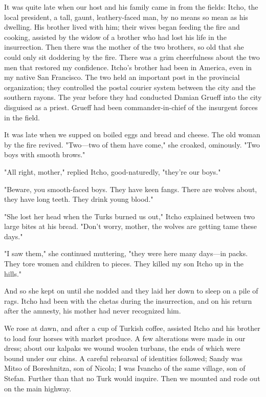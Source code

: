 \documentclass[a5paper,12pt]{book}
\begin{document}
It was quite late when our host and his family came in from the fields: Itcho, the local president, a tall, gaunt, leathery-faced man, by no means so mean as his dwelling. His brother lived with him; their wives began feeding the fire and cooking, assisted by the widow of a brother who had lost his life in the insurrection. Then there was the mother of the two brothers, so old that she could only sit doddering by the fire. There was a grim cheerfulness about the two men that restored my confidence. Itcho’s brother had been in America, even in my native San Francisco. The two held an important post in the provincial organization; they controlled the postal courier system between the city and the southern rayons. The year before they had conducted Damian Grueff into the city disguised as a priest. Grueff had been commander-in-chief of the insurgent forces in the field.

It was late when we supped on boiled eggs and bread and cheese. The old woman by the fire revived.
"Two—two of them have come," she croaked, ominously. "Two boys with smooth brows."

"All right, mother," replied Itcho, good-naturedly, "they’re our boys."

"Beware, you smooth-faced boys. They have keen fangs. There are wolves about, they have long teeth. They drink young blood."

"She lost her head when the Turks burned us out," Itcho explained between two large bites at his bread. "Don’t worry, mother, the wolves are getting tame these days."

"I saw them," she continued muttering, "they were here many days—in packs. They tore women and children to pieces. They killed my son Itcho up in the hills."

And so she kept on until she nodded and they laid her down to sleep on a pile of rags. Itcho had been with the chetas during the insurrection, and on his return after the amnesty, his mother had never recognized him.

We rose at dawn, and after a cup of Turkish coffee, assisted Itcho and his brother to load four horses with market produce. A few alterations were made in our dress; about our kalpaks we wound woolen turbans, the ends of which were bound under our chins. A careful rehearsal of identities followed; Sandy was Mitso of Boreshnitza, son of Nicola; I was Ivancho of the same village, son of Stefan. Further than that no Turk would inquire. Then we mounted and rode out on the main highway.
\end{document}
